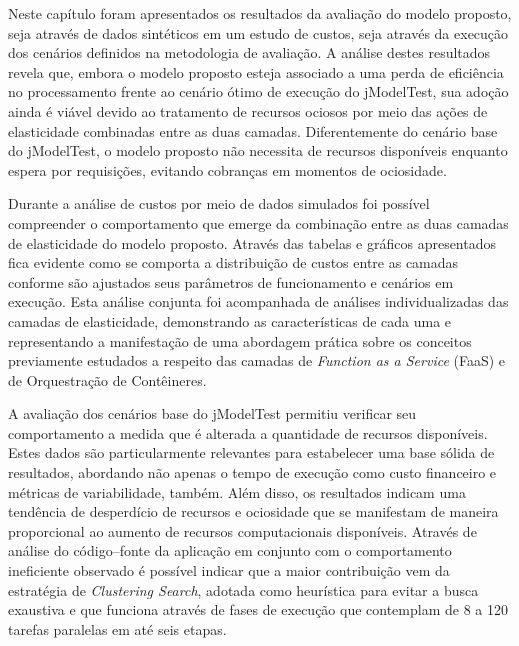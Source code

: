 \documentclass[english,brazilian]{UNISINOSmonografia} %
\begin{document}
Neste capítulo foram apresentados os resultados da avaliação do modelo proposto, seja através de dados sintéticos em um estudo de custos, seja através da execução dos cenários definidos na metodologia de avaliação.
%
A análise destes resultados revela que, embora o modelo proposto esteja associado a uma perda de eficiência no processamento frente ao cenário ótimo de execução do jModelTest, sua adoção ainda é viável devido ao tratamento de recursos ociosos por meio das ações de elasticidade combinadas entre as duas camadas.
%
Diferentemente do cenário base do jModelTest, o modelo proposto não necessita de recursos disponíveis enquanto espera por requisições, evitando cobranças em momentos de ociosidade.



Durante a análise de custos por meio de dados simulados foi possível compreender o comportamento que emerge da combinação entre as duas camadas de elasticidade do modelo proposto.
%
Através das tabelas e gráficos apresentados fica evidente como se comporta a distribuição de custos entre as camadas conforme são ajustados seus parâmetros de funcionamento e cenários em execução.
%
Esta análise conjunta foi acompanhada de análises individualizadas das camadas de elasticidade, demonstrando as características de cada uma e representando a manifestação de uma abordagem prática sobre os conceitos previamente estudados a respeito das camadas de \textit{Function as a Service} (FaaS) e de Orquestração de Contêineres.



A avaliação dos cenários base do jModelTest permitiu verificar seu comportamento a medida que é alterada a quantidade de recursos disponíveis.
%
Estes dados são particularmente relevantes para estabelecer uma base sólida de resultados, abordando não apenas o tempo de execução como custo financeiro e métricas de variabilidade, também.
%
Além disso, os resultados indicam uma tendência de desperdício de recursos e ociosidade que se manifestam de maneira proporcional ao aumento de recursos computacionais disponíveis.
%
Através de análise do código--fonte da aplicação em conjunto com o comportamento ineficiente observado é possível indicar que a maior contribuição vem da estratégia de \textit{Clustering Search}, adotada como heurística para evitar a busca exaustiva e que funciona através de fases de execução que contemplam de 8 a 120 tarefas paralelas em até seis etapas.


\end{document}
